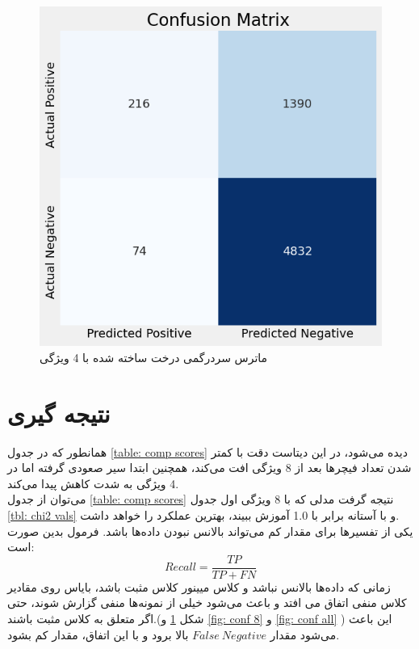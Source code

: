 \documentclass{article}
\begin{document}
	\begin{figure}[H]
		\centering
		\includegraphics[scale=0.6]{figs/conf4}
		\caption{
			ماترس سردرگمی
			درخت ساخته شده با 4 ویژگی
		}
		\label{fig: conf 4}
	\end{figure}
	\section{نتیجه گیری}
	همانطور که در جدول 
	\ref{table: comp scores}
	دیده می‌شود، در این دیتاست دقت با کمتر شدن تعداد فیچر‌ها بعد از 8 ویژگی افت می‌کند، همچنین 
	ابتدا سیر صعودی گرفته اما در 4 ویژگی به شدت کاهش پیدا می‌کند.\\
	می‌توان از جدول 
	\ref{table: comp scores}
	نتیجه گرفت مدلی که با 8 ویژگی اول جدول
	\ref{tbl: chi2 vals}
	و با آستانه 
	برابر با 1.0 آموزش ببیند، بهترین عملکرد را خواهد داشت.\\
	یکی از تفسیر‌ها برای مقدار کم 
	می‌تواند بالانس نبودن داده‌ها باشد. فرمول 
	بدین صورت است:
	\[
												Recall = \frac{TP}{TP + FN}
	\]
	زمانی که داده‌ها بالانس نباشد و کلاس میینور کلاس مثبت باشد، بایاس روی مقادیر کلاس منفی اتفاق می افتد و باعث می‌شود خیلی از نمونه‌ها منفی گزارش شوند، حتی اگر متعلق به کلاس مثبت باشند.(شکل
	\ref{fig: conf 4}
	و
	\ref{fig: conf 8}
	و
	\ref{fig: conf all}
	) این باعث می‌شود مقدار $False~Negative$ بالا برود و با این اتفاق، 
	مقدار 
	کم بشود.
\end{document}
